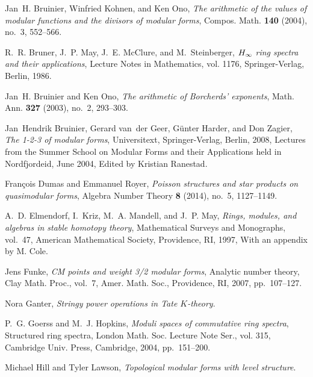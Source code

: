 \documentclass{gtpart}
\theoremstyle{definition}
\theoremstyle{remark}
\renewcommand{\=}{\approx}
\renewcommand{\-}{\sim}
\numberwithin{equation}{section}
\numberwithin{thm}{section}
\begin{document}
\begin{thebibliography}
Jan~H. Bruinier, Winfried Kohnen, and Ken Ono, \emph{The arithmetic of the
  values of modular functions and the divisors of modular forms}, Compos. Math.
  \textbf{140} (2004), no.~3, 552--566. 

R.~R. Bruner, J.~P. May, J.~E. McClure, and M.~Steinberger, \emph{{$H\sb \infty
  $} ring spectra and their applications}, Lecture Notes in Mathematics, vol.
  1176, Springer-Verlag, Berlin, 1986. 

Jan~H. Bruinier and Ken Ono, \emph{The arithmetic of {B}orcherds' exponents},
  Math. Ann. \textbf{327} (2003), no.~2, 293--303. 

Jan~Hendrik Bruinier, Gerard van~der Geer, G{\"u}nter Harder, and Don Zagier,
  \emph{The 1-2-3 of modular forms}, Universitext, Springer-Verlag, Berlin,
  2008, Lectures from the Summer School on Modular Forms and their Applications
  held in Nordfjordeid, June 2004, Edited by Kristian Ranestad. 

Fran{\c{c}}ois Dumas and Emmanuel Royer, \emph{Poisson structures and star
  products on quasimodular forms}, Algebra Number Theory \textbf{8} (2014),
  no.~5, 1127--1149. \linebreak {}

A.~D. Elmendorf, I.~Kriz, M.~A. Mandell, and J.~P. May, \emph{Rings, modules,
  and algebras in stable homotopy theory}, Mathematical Surveys and Monographs,
  vol.~47, American Mathematical Society, Providence, RI, 1997, With an
  appendix by M. Cole. 

Jens Funke, \emph{C{M} points and weight 3/2 modular forms}, Analytic number
  theory, Clay Math. Proc., vol.~7, Amer. Math. Soc., Providence, RI, 2007,
  pp.~107--127. 

Nora Ganter, \emph{Stringy power operations in {T}ate {$K$}-theory}. 

P.~G. Goerss and M.~J. Hopkins, \emph{Moduli spaces of commutative ring
  spectra}, Structured ring spectra, London Math. Soc. Lecture Note Ser., vol.
  315, Cambridge Univ. Press, Cambridge, 2004, pp.~151--200. 

Michael Hill and Tyler Lawson, \emph{Topological modular forms with level
  structure}. 


\end{thebibliography}
\end{document}
